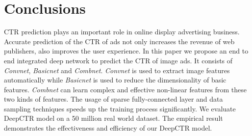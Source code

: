 \documentclass{sig-alternate}
\begin{document}
\section{Conclusions}
CTR prediction plays an important role in online display advertising business. Accurate prediction of the CTR of ads not only increases the revenue of web publishers, also improves the user experience. In this paper we propose an end to end integrated deep network to predict the CTR of image ads.  It consists of \emph{Convnet}, \emph{Basicnet} and \emph{Combnet}. \emph{Convnet} is used to extract image features automatically while \emph{Basicnet} is used to reduce the dimensionality of basic features. \emph{Combnet} can learn complex and effective non-linear features from these two kinds of  features. The usage of sparse fully-connected layer and data sampling techniques speeds up the training process significantly.
We evaluate DeepCTR model on a 50 million real world dataset. The empirical result demonstrates 
the effectiveness and efficiency of our DeepCTR model. 



%

%
\end{document}
